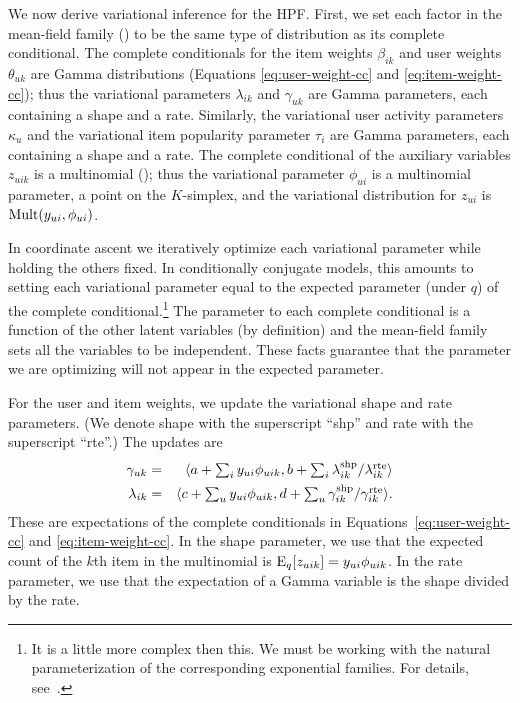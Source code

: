 \documentclass{sig-alternate}
\begin{document}
We now derive variational inference for the HPF. First, we set each
factor in the mean-field family () to be the same type of
distribution as its complete conditional.  The complete conditionals
for the item weights $\beta_{ik}$ and user weights $\theta_{uk}$ are
Gamma distributions (Equations \ref{eq:user-weight-cc} and
\ref{eq:item-weight-cc}); thus the variational parameters
$\lambda_{ik}$ and $\gamma_{uk}$ are Gamma parameters, each containing
a shape and a rate.  Similarly, the variational user activity
parameters $\kappa_u$ and the variational item popularity parameter
$\tau_i$ are Gamma parameters, each containing a shape and a rate.
The complete conditional of the auxiliary variables $z_{uik}$ is a
multinomial (); thus the variational parameter
$\phi_{ui}$ is a multinomial parameter, a point on the $K$-simplex,
and the variational distribution for $z_{ui}$ is $\textrm{Mult}(y_{ui},
\phi_{ui})$.

In coordinate ascent we iteratively optimize each variational
parameter while holding the others fixed.  In conditionally conjugate
models, this amounts to setting each variational parameter equal to
the expected parameter (under $q$) of the complete
conditional.\footnote{It is a little more complex then this.  We must
  be working with the natural parameterization of the corresponding
  exponential families.  For details, see~\cite{Hoffman:2013}.}  The
parameter to each complete conditional is a function of the other
latent variables (by definition) and the mean-field family sets all
the variables to be independent.  These facts guarantee that the
parameter we are optimizing will not appear in the expected parameter.


For the user and item weights, we update the variational shape and
rate parameters.  (We denote shape with the superscript ``shp'' and
rate with the superscript ``rte''.) The updates are
\begin{eqnarray}
  \gamma_{uk} &=& \langle a + \textstyle \sum_{i} y_{ui} \phi_{uik},
  b + \textstyle \sum_i \lambda_{ik}^{\textrm{shp}} / \lambda_{ik}^{\textrm{rte}} \rangle \\
  \lambda_{ik} &=& \langle c + \textstyle \sum_{u} y_{ui} \phi_{uik},
  d + \textstyle \sum_u \gamma_{ik}^{\textrm{shp}} / \gamma_{ik}^{\textrm{rte}} \rangle.
\end{eqnarray}
These are expectations of the complete conditionals in
Equations~\ref{eq:user-weight-cc} and \ref{eq:item-weight-cc}.  In the
shape parameter, we use that the expected count of the $k$th item in
the multinomial is $\textrm{E}_q[z_{uik}] = y_{ui} \phi_{uik}$. In the rate
parameter, we use that the expectation of a Gamma variable is the
shape divided by the rate.
\end{document}
